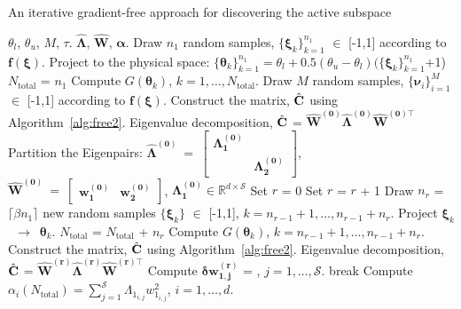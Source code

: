 \bigskip
\begin{breakablealgorithm}
\renewcommand{\algorithmicrequire}{\textbf{Input:}}
\renewcommand{\algorithmicensure}{\textbf{Output:}}
  \caption{An iterative gradient-free approach for discovering the active subspace}
  \begin{algorithmic}[1]
\Require $\theta_l$, $\theta_u$, $M$, $\tau$. 
\Ensure $\bm{\hat{\Lambda}}$, $\bm{\hat{W}}$, $\bm{\alpha}$. 
	\State Draw $n_1$ random samples, $\{\bm{\xi}_k\}_{k=1}^{n_1}$ $\in$ [-1,1]
         according to $\bm{f(\xi)}$.
	\State Project to the physical space:
        $\{\bm{\theta}_k\}_{k=1}^{n_1}=\theta_l+0.5(\theta_u-\theta_l)(\{\bm{\xi}_k\}_{k=1}^{n_1}$+1)
	\State $N_\text{total}$ = $n_1$ 
	\State Compute $G(\bm\theta_k)$, $k=1, \ldots, N_\text{total}$.
	\State Draw $M$ random samples, $\{\bm{\nu}_i\}_{i=1}^{M}$ $\in$ [-1,1]
         according to $\bm{f(\xi)}$.
	\State Construct the matrix, $\hat{\mathbf{{C}}}$ using Algorithm~\ref{alg:free2}.
	\State Eigenvalue decomposition, $\hat{\mathbf{{C}}}$ = 
	$\bm{\hat{W}^{(0)}}\bm{\hat{\Lambda}^{(0)}} \bm{\hat{W}^{(0)\top}}$
	\State Partition the Eigenpairs: $\bm{\hat{\Lambda}^{(0)}}~=~ 
        \begin{bmatrix} \bm{\Lambda_1^{(0)}} & \\ & \bm{\Lambda_2^{(0)}} \end{bmatrix}$, 
        $\bm{\hat{W}^{(0)}}~=~\begin{bmatrix} \bm{w_1^{(0)}} & \bm{w_2^{(0)}} \end{bmatrix}$, 
        $\bm{\Lambda_1^{(0)}}\in \mathbb{R}^{d\times\mathcal{S}}$
	\State Set $r$ = 0
	\Loop
		\State Set $r$ = $r$ + 1
		\State Draw $n_r$ = $\lceil \beta n_1 \rceil$ new random samples 
                $\{\bm{\xi}_k\}$ $\in$ [-1,1], $k = n_{r-1}+1,\ldots,n_{r-1}+n_r$.
		\State Project $\bm{\xi}_k$~$\rightarrow$~$\bm{\theta}_k$.
		\State $N_\text{total}$ = $N_\text{total}$ + $n_r$ 
		\State Compute $G(\bm\theta_k)$, $k=n_{r-1}+1, \ldots, n_{r-1}+n_r$.  
		\State Construct the matrix, $\hat{\mathbf{{C}}}$ using Algorithm~\ref{alg:free2}.
		\State Eigenvalue decomposition, $\hat{\mathbf{{C}}}$ = $\bm{\hat{W}^{(r)}}\bm{\hat{\Lambda}^{(r)}}
		 \bm{\hat{W}^{(r)\top}}$
		\State Compute $\bm{\delta w_{1,j}^{(r)}}$ = 
                       , 
                       $j = 1,\ldots,\mathcal{S}$.
			\State break
		\EndIf
	\EndLoop
	\State Compute $\alpha_i(N_\text{total}) = \sum\limits_{j=1}^{\mathcal{S}} \Lambda_{1_{i,j}}w_{1_{i,j}}^2$,
	$i=1,\ldots,d$.
    \EndProcedure
  \end{algorithmic}
  \label{alg:free1}
\end{breakablealgorithm}
\bigskip

